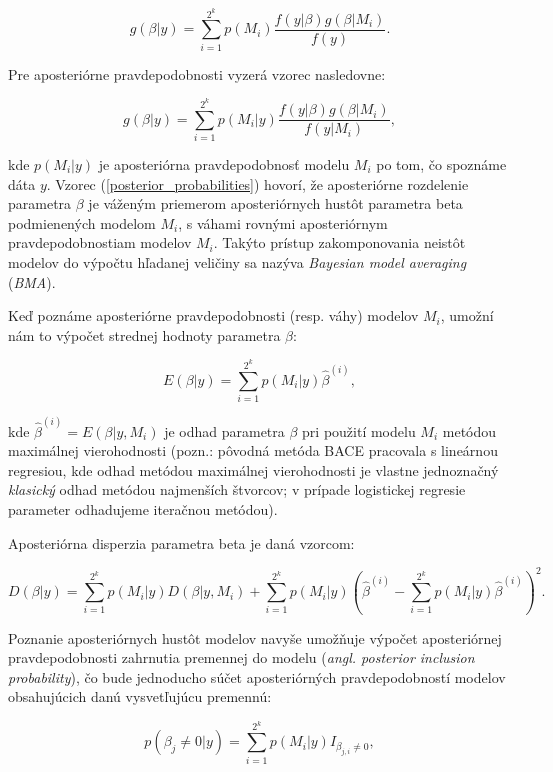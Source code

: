 \[
    g(\beta | y) = \sum_{i = 1}^{2^k} p(M_i) \frac{f(y | \beta) g(\beta | M_i)}{f(y)}.
\]

Pre aposteriórne pravdepodobnosti vyzerá vzorec nasledovne:

\begin{equation} \label{posterior_probabilities}
    g(\beta | y) = \sum_{i = 1}^{2^k} p(M_i | y) \frac{f(y | \beta) g(\beta | M_i)}{f(y | M_i)},
\end{equation}

kde \(p(M_i|y)\) je aposteriórna pravdepodobnosť modelu \(M_i\) po tom, čo spoznáme dáta \(y\).
Vzorec (\ref{posterior_probabilities}) hovorí, že aposteriórne rozdelenie parametra \(\beta\) je váženým priemerom aposteriórnych hustôt parametra beta podmienených modelom \(M_i\),
s váhami rovnými aposteriórnym pravdepodobnostiam modelov \(M_i\).
Takýto prístup zakomponovania neistôt modelov do výpočtu hľadanej veličiny sa nazýva \emph{Bayesian model averaging} (\emph{BMA}).

Keď poznáme aposteriórne pravdepodobnosti (resp. váhy) modelov \( M_i \), umožní nám to výpočet strednej hodnoty parametra \( \beta \):

\begin{equation} \label{posterior_expected_value}
    E(\beta | y) = \sum_{i = 1}^{2^k} p(M_i | y) \hat{\beta}^{(i)},
\end{equation}

kde \( \hat{\beta}^{(i)} = E(\beta |y, M_i) \) je odhad parametra \( \beta \) pri použití modelu \( M_i \) metódou maximálnej vierohodnosti
(pozn.: pôvodná metóda BACE pracovala s lineárnou regresiou, kde odhad metódou maximálnej vierohodnosti je vlastne jednoznačný \emph{klasický} odhad metódou najmenších štvorcov;
v prípade logistickej regresie parameter odhadujeme iteračnou metódou).

Aposteriórna disperzia parametra beta je daná vzorcom:

\[
    D(\beta | y) = \sum_{i = 1}^{2^k} p(M_i | y) D(\beta | y, M_i) + \sum_{i = 1}^{2^k} p(M_i | y) \left( \hat{\beta}^{(i)} - \sum_{i = 1}^{2^k} p(M_i | y) \hat{\beta}^{(i)} \right)^2.
\]

Poznanie aposteriórnych hustôt modelov navyše umožňuje výpočet aposteriórnej pravdepodobnosti zahrnutia premennej do modelu (\emph{angl. posterior inclusion probability}),
čo bude jednoducho súčet aposteriórných pravdepodobností modelov obsahujúcich danú vysvetľujúcu premennú:

\begin{equation} \label{posterior_inclusion_probability}
    p(\beta_j \neq 0 | y) = \sum_{i = 1}^{2^k} p(M_i | y) I_{\beta_{j, i} \neq 0},
\end{equation}

